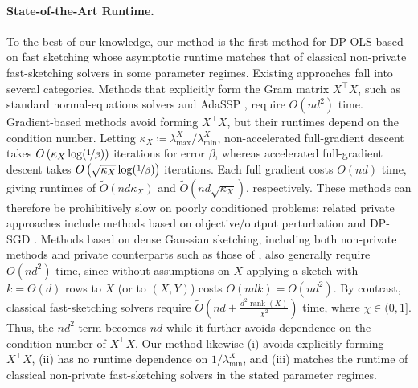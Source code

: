 \documentclass[11pt]{article}
\theoremstyle{definition}
\theoremstyle{plain}
\begin{document}
\paragraph{State-of-the-Art Runtime.}
To the best of our knowledge, our method is the first method for DP-OLS based on fast sketching whose asymptotic runtime matches that of classical non-private fast-sketching solvers in some parameter regimes. Existing approaches fall into several categories. Methods that explicitly form the Gram matrix $X^{\top}X$, such as standard normal-equations solvers and AdaSSP \citep{wang_adassp}, require $O(nd^{2})$ time. Gradient-based methods avoid forming $X^{\top}X$, but their runtimes depend on the condition number. Letting $\kappa_X\coloneqq\lambda_{\max}^{X}/\lambda_{\min}^{X}$, non-accelerated full-gradient descent takes $O\left(\kappa_X\log(\nicefrac{1}{\beta})\right)$ iterations for error $\beta$, whereas accelerated full-gradient descent takes $O\left(\sqrt{\kappa_X}\log(\nicefrac{1}{\beta})\right)$ iterations. Each full gradient costs $O(nd)$ time, giving runtimes of $\widetilde{O}\left(nd\kappa_X\right)$ and $\widetilde{O}\left(nd\sqrt{\kappa_X}\right)$, respectively. These methods can therefore be prohibitively slow on poorly conditioned problems; related private approaches include methods based on objective/output perturbation \citep{chaudhuri2011differentially} and DP-SGD \citep{abadi2016deep}. Methods based on dense Gaussian sketching, including both non-private methods and private counterparts such as those of \citet{sheffet2017differentially,lev2026near}, also generally require $O(nd^{2})$ time, since without assumptions on $X$ applying a sketch with $k=\Theta(d)$ rows to $X$ (or to $(X,Y)$) costs $O(ndk)=O(nd^{2})$. By contrast, classical fast-sketching solvers require $\widetilde{O}\left(nd+\frac{d^2\operatorname{rank}(X)}{\chi^2}\right)$ time, where $\chi\in(0,1]$. Thus, the $nd^{2}$ term becomes $nd$ while it further avoids dependence on the condition number of $X^{\top}X$. Our method likewise (i) avoids explicitly forming $X^{\top}X$, (ii) has no runtime dependence on $1/\lambda_{\min}^{X}$, and (iii) matches the runtime of classical non-private fast-sketching solvers in the stated parameter regimes.
\end{document}
